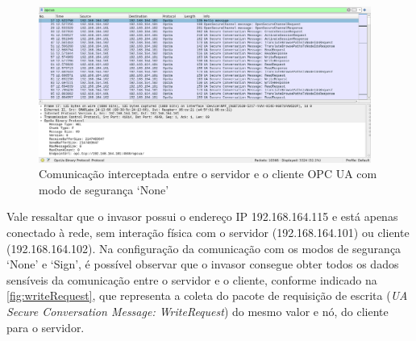         \begin{figure}[htbp!]
            \caption{\label{fig:0-sniffing-wireshark}Comunicação interceptada entre o servidor e o cliente OPC UA com modo de segurança `None'}
            \begin{center}
                \includegraphics[width=0.972\textwidth]{USPSC-img/0-sniffing-wireshark-filtered-anon.png}
            \end{center}
        \end{figure}

        Vale ressaltar que o invasor possui o endereço IP 192.168.164.115 e está apenas conectado à rede, sem interação física com o servidor (192.168.164.101) ou cliente (192.168.164.102). Na configuração da comunicação com os modos de segurança `None' e `Sign', é possível observar que o invasor consegue obter todos os dados sensíveis da comunicação entre o servidor e o cliente, conforme indicado na \autoref{fig:writeRequest}, que representa a coleta do pacote de requisição de escrita (\textit{UA Secure Conversation Message: WriteRequest}) do mesmo valor e nó, do cliente para o servidor.

